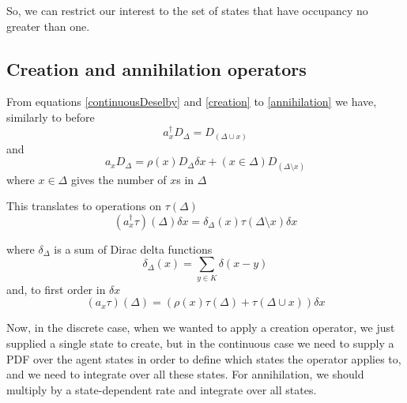 \documentclass[letterpaper,twocolumn,10pt]{article}
\begin{document}
So, we can restrict our interest to the set of states that have occupancy no greater than one.

\subsection{Creation and annihilation operators}

From equations \ref{continuousDeselby} and \ref{creation} to \ref{annihilation} we have, similarly to before
\[
a_x^\dag D_\Delta = D_{(\Delta \cup x)}
\]
and
\[
a_x D_\Delta = \rho(x) D_\Delta \delta x + (x \in \Delta) D_{(\Delta \setminus x)}
\]
where $x \in \Delta$ gives the number of $x$s in $\Delta$

This translates to operations on $\tau(\Delta)$
\[
(a_x^\dag \tau)(\Delta)\delta x = \delta_\Delta(x)\tau(\Delta \setminus x)\delta x
\]

where $\delta_\Delta$ is a sum of Dirac delta functions
\[
\delta_\Delta(x) = \sum_{y\in K}\delta(x-y)
\]
and, to first order in $\delta x$
\[
(a_x \tau)(\Delta) = \left(\rho(x)\tau(\Delta) + \tau(\Delta \cup x)\right) \delta x
\]

Now, in the discrete case, when we wanted to apply a creation operator, we just supplied a single state to create, but in the continuous case we need to supply a PDF over the agent states in order to define which states the operator applies to, and we need to integrate over all these states. For annihilation, we should multiply by a state-dependent rate and integrate over all states.






\end{document}
